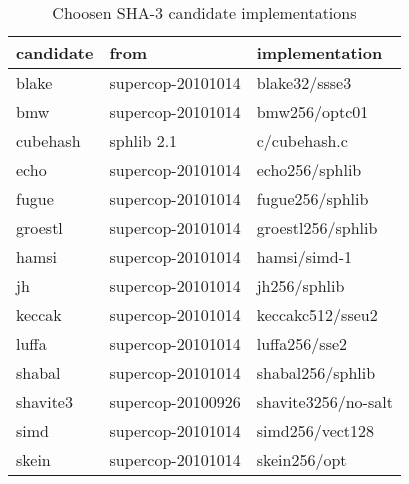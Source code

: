\begin{table}
  \centering
  \begin{tabular}{ | l | l | l | }
    \hline
    \textbf{candidate} & \textbf{from} & \textbf{implementation} \\ \hline
     blake      & supercop-20101014 & blake32/ssse3 \\ \hline
     bmw        & supercop-20101014 & bmw256/optc01 \\ \hline
     cubehash   & sphlib 2.1        & c/cubehash.c  \\ \hline
     echo       & supercop-20101014 & echo256/sphlib\\ \hline
     fugue      & supercop-20101014 & fugue256/sphlib\\ \hline
     groestl    & supercop-20101014 & groestl256/sphlib\\ \hline
     hamsi      & supercop-20101014 & hamsi/simd-1  \\ \hline
     jh         & supercop-20101014 & jh256/sphlib  \\ \hline
     keccak     & supercop-20101014 & keccakc512/sseu2 \\ \hline
     luffa      & supercop-20101014 & luffa256/sse2 \\ \hline
     shabal     & supercop-20101014 & shabal256/sphlib\\ \hline
     shavite3   & supercop-20100926 & shavite3256/no-salt       \\ \hline
     simd       & supercop-20101014 & simd256/vect128 \\ \hline
     skein      & supercop-20101014 & skein256/opt           \\ \hline
  \end{tabular}
  \caption{Choosen \ac{SHA}-3 candidate implementations}
  \label{tbl:sha3:implementations}
\end{table}
